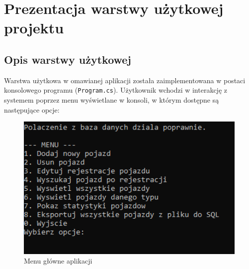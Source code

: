 ﻿%
\chapter{Prezentacja warstwy użytkowej projektu}

\section{Opis warstwy użytkowej}
Warstwa użytkowa w omawianej aplikacji została zaimplementowana 
w postaci konsolowego programu (\texttt{Program.cs}). Użytkownik wchodzi w interakcję 
z systemem poprzez menu wyświetlane w konsoli, w którym dostępne są następujące opcje:
\begin{figure}[H] 
    \centering
    \includegraphics[width=1\textwidth]{ManuGlowne.png}
    \caption{Menu główne aplikacji}
    \label{fig:moj_obrazek}
\end{figure}
